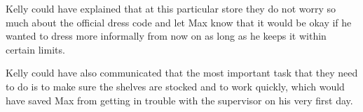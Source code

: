 \documentclass[12pt,titlepage]{article}
\begin{document}
Kelly could have explained that at this particular store they do not worry so much about the official dress code and let Max know that it would be okay if he wanted to dress more informally from now on as long as he keeps it within certain limits. 

Kelly could have also communicated that the most important task that they need to do is to make sure the shelves are stocked and to work quickly, which would have saved Max from getting in trouble with the supervisor on his very first day. 
\end{document}
